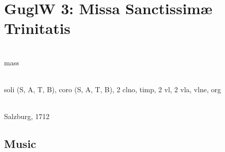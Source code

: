 \documentclass[abbrwidth=7em,shorttitlesize=55]{ees}
\begin{document}
\clearpage
\section{GuglW 3: Missa Sanctissimæ Trinitatis}

\\
mass

\\
soli (S, A, T, B), coro (S, A, T, B), 2 clno, timp, 2 vl, 2 vla, vlne, org

\\
Salzburg, 1712


\subsection{Music}
\end{document}

